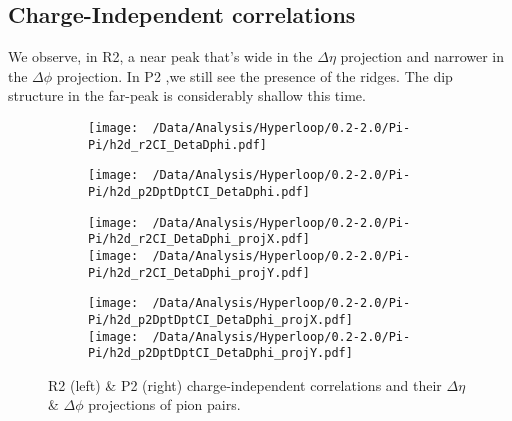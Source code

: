 \documentclass[12pt,a4paper,twoside]{report}
\begin{document}
\subsection{Charge-Independent correlations}
We observe, in R2, a near peak that's wide in the $\Delta\eta$ projection and narrower in the $\Delta\phi$ projection. In P2 ,we still see the presence of the ridges. The dip structure in the far-peak is considerably shallow this time.
\begin{figure}[H]
	\begin{subfigure}{0.49\linewidth}
		\texttt{[image: ~/Data/Analysis/Hyperloop/0.2-2.0/Pi-Pi/h2d\_r2CI\_DetaDphi.pdf]}\\
	\end{subfigure}
	\begin{subfigure}{0.49\linewidth}
		\texttt{[image: ~/Data/Analysis/Hyperloop/0.2-2.0/Pi-Pi/h2d\_p2DptDptCI\_DetaDphi.pdf]}\\
	\end{subfigure}
\end{figure}
\begin{figure}[H]
	\ContinuedFloat
	\begin{subfigure}{0.49\linewidth}
		\texttt{[image: ~/Data/Analysis/Hyperloop/0.2-2.0/Pi-Pi/h2d\_r2CI\_DetaDphi\_projX.pdf]}\\
		\texttt{[image: ~/Data/Analysis/Hyperloop/0.2-2.0/Pi-Pi/h2d\_r2CI\_DetaDphi\_projY.pdf]}\\
	\end{subfigure}
	\begin{subfigure}{0.49\linewidth}
		\texttt{[image: ~/Data/Analysis/Hyperloop/0.2-2.0/Pi-Pi/h2d\_p2DptDptCI\_DetaDphi\_projX.pdf]}\\
		\texttt{[image: ~/Data/Analysis/Hyperloop/0.2-2.0/Pi-Pi/h2d\_p2DptDptCI\_DetaDphi\_projY.pdf]}\\
	\end{subfigure}
	\caption{R2 (left) \& P2 (right) charge-independent correlations and their $\Delta\eta$ \& $\Delta\phi$ projections of pion pairs.}
\end{figure}
\end{document}
